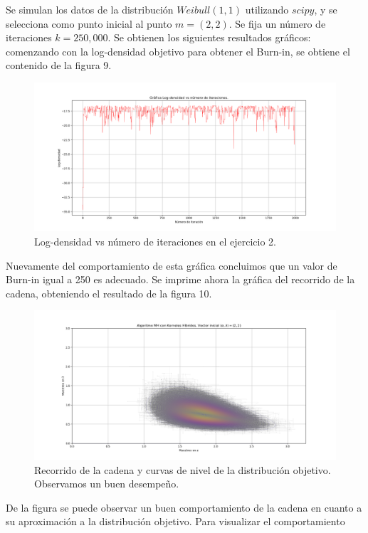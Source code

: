 \documentclass[letterpaper]{article}
\newcommand{\1}{\mathds{1}}
\theoremstyle{definition}
\theoremstyle{definition}
\theoremstyle{definition}
\theoremstyle{definition}
\theoremstyle{definition}
\begin{document}
\begin{itemize}
    Se simulan los datos de la distribución $Weibull(1,1)$ utilizando $scipy$, y se selecciona como punto inicial al punto $m=(2,2)$.
    Se fija un número de iteraciones $k=250,000$. Se obtienen los siguientes
    resultados gráficos: comenzando con la log-densidad objetivo para obtener el Burn-in, se obtiene el contenido de la figura 9.\\
    \begin{figure}[h!]
        \centering
        \includegraphics[width=\linewidth]{9.png}
        \caption{Log-densidad vs número de iteraciones en el ejercicio 2.}
    \end{figure} 
    Nuevamente del comportamiento de esta gráfica concluimos que un valor de Burn-in igual a 250 es adecuado. Se imprime ahora la gráfica del recorrido de la cadena, obteniendo 
    el resultado de la figura 10.\\
    \begin{figure}[h!]
        \centering
        \includegraphics[width=\linewidth]{10.png}
        \caption{Recorrido de la cadena y curvas de nivel de la distribución objetivo. Observamos un buen desempeño.}
    \end{figure} 
    De la figura se puede observar un buen comportamiento de la cadena en cuanto a su aproximación a la distribución objetivo. Para visualizar el comportamiento 

\end{itemize}
\end{document}
